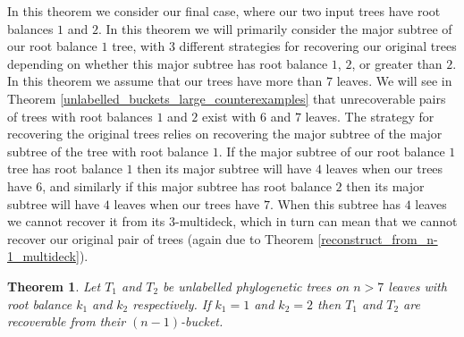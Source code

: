 \documentclass[12pt]{article}
\newtheorem{Theorem}{Theorem}[section]
\theoremstyle{definition}
\begin{document}
In this theorem we consider our final case, where our two input trees have root balances $1$ and $2$. In this theorem we will primarily consider the major subtree of our root balance $1$ tree, with 3 different strategies for recovering our original trees depending on whether this major subtree has root balance $1$, $2$, or greater than $2$. In this theorem we assume that our trees have more than $7$ leaves. We will see in Theorem \ref{unlabelled_buckets_large_counterexamples} that unrecoverable pairs of trees with root balances $1$ and $2$ exist with $6$ and $7$ leaves. The strategy for recovering the original trees relies on recovering the major subtree of the major subtree of the tree with root balance $1$. If the major subtree of our root balance $1$ tree has root balance $1$ then its major subtree will have $4$ leaves when our trees have $6$, and similarly if this major subtree has root balance $2$ then its major subtree will have $4$ leaves when our trees have $7$. When this subtree has $4$ leaves we cannot recover it from its $3$-multideck, which in turn can mean that we cannot recover our original pair of trees (again due to Theorem \ref{reconstruct_from_n-1_multideck}).

\begin{Theorem}\label{unlabelled_buckets_theorem6}
    Let $T_1$ and $T_2$ be unlabelled phylogenetic trees on $n>7$ leaves with root balance $k_1$ and $k_2$ respectively. If $k_1 = 1$ and $k_2 = 2$ then $T_1$ and $T_2$ are recoverable from their $(n-1)$-bucket.
\end{Theorem}
\end{document}
